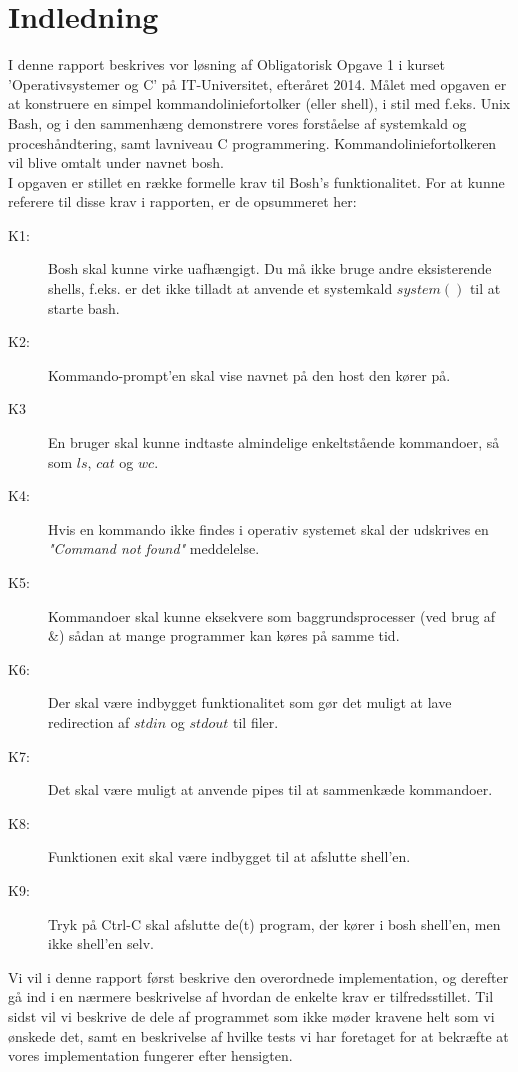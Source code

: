 \documentclass{article}
\begin{document}

\tableofcontents
\pagebreak

\section{Indledning}
I denne rapport beskrives vor løsning af Obligatorisk Opgave 1 i kurset 'Operativsystemer og C' på IT-Universitet, efteråret 2014. Målet med opgaven er at konstruere en simpel kommandoliniefortolker (eller shell), i stil med f.eks. Unix Bash, og i den sammenhæng demonstrere vores forståelse af systemkald og proceshåndtering, samt lavniveau C programmering. Kommandoliniefortolkeren vil blive omtalt under navnet bosh.\\

I opgaven er stillet en række formelle krav til Bosh’s funktionalitet. For at kunne referere til disse krav i rapporten, er de opsummeret her:\\

\begin{description}
\item[K1:] Bosh skal kunne virke uafhængigt. Du må ikke bruge andre eksisterende shells, f.eks. er det ikke tilladt at anvende et systemkald $system()$ til at starte bash.
\item[K2:] Kommando-prompt'en skal vise navnet på den host den kører på.
\item[K3] En bruger skal kunne indtaste almindelige enkeltstående kommandoer, så som $ls$, $cat$ og $wc$. 
\item[K4:] Hvis en kommando ikke findes i operativ systemet skal der udskrives en \emph{"Command not found"} meddelelse.
\item[K5:] Kommandoer skal kunne eksekvere som baggrundsprocesser (ved brug af \&) sådan at mange programmer kan køres på samme tid.
\item[K6:] Der skal være indbygget funktionalitet som gør det muligt at lave redirection af $stdin$ og $stdout$ til filer. 
\item[K7:] Det skal være muligt at anvende pipes til at sammenkæde kommandoer. 
\item[K8:] Funktionen exit skal være indbygget til at afslutte shell'en.
\item[K9:] Tryk på Ctrl-C skal afslutte de(t) program, der kører i bosh shell'en, men ikke shell'en selv.
\end{description}

Vi vil i denne rapport først beskrive den overordnede implementation, og derefter gå ind i en nærmere beskrivelse af hvordan de enkelte krav er tilfredsstillet. Til sidst vil vi beskrive de dele af programmet som ikke møder kravene helt som vi ønskede det, samt en beskrivelse af hvilke tests vi har foretaget for at bekræfte at vores implementation fungerer efter hensigten.\\
\end{document}

